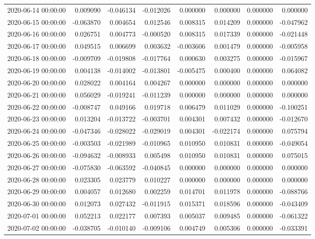 \begin{tabular}{lrrrrrrr}
2020-06-14 00:00:00 & 0.009090 & -0.046134 & -0.012026 & 0.000000 & 0.000000 & 0.000000 & 0.000000 \\
2020-06-15 00:00:00 & -0.063870 & 0.004654 & 0.012546 & 0.008315 & 0.014209 & 0.000000 & -0.047962 \\
2020-06-16 00:00:00 & 0.026751 & 0.004773 & -0.000520 & 0.008315 & 0.017339 & 0.000000 & -0.021448 \\
2020-06-17 00:00:00 & 0.049515 & 0.006699 & 0.003632 & -0.003606 & 0.001479 & 0.000000 & -0.005958 \\
2020-06-18 00:00:00 & -0.009709 & -0.019808 & -0.017764 & 0.000630 & 0.003275 & 0.000000 & -0.015967 \\
2020-06-19 00:00:00 & 0.004138 & -0.014002 & -0.013801 & -0.005475 & 0.000400 & 0.000000 & 0.064082 \\
2020-06-20 00:00:00 & 0.028022 & 0.004164 & 0.004267 & 0.000000 & 0.000000 & 0.000000 & 0.000000 \\
2020-06-21 00:00:00 & 0.056029 & -0.019241 & -0.011239 & 0.000000 & 0.000000 & 0.000000 & 0.000000 \\
2020-06-22 00:00:00 & -0.008747 & 0.049166 & 0.019718 & 0.006479 & 0.011029 & 0.000000 & -0.100251 \\
2020-06-23 00:00:00 & 0.013204 & -0.013722 & -0.003701 & 0.004301 & 0.007432 & 0.000000 & -0.012670 \\
2020-06-24 00:00:00 & -0.047346 & -0.028022 & -0.029019 & 0.004301 & -0.022174 & 0.000000 & 0.075794 \\
2020-06-25 00:00:00 & -0.003503 & -0.021989 & -0.010965 & 0.010950 & 0.010831 & 0.000000 & -0.049054 \\
2020-06-26 00:00:00 & -0.094632 & -0.008933 & 0.005498 & 0.010950 & 0.010831 & 0.000000 & 0.075015 \\
2020-06-27 00:00:00 & -0.075830 & -0.063592 & -0.040845 & 0.000000 & 0.000000 & 0.000000 & 0.000000 \\
2020-06-28 00:00:00 & 0.023305 & 0.023779 & 0.010227 & 0.000000 & 0.000000 & 0.000000 & 0.000000 \\
2020-06-29 00:00:00 & 0.004057 & 0.012680 & 0.002259 & 0.014701 & 0.011978 & 0.000000 & -0.088766 \\
2020-06-30 00:00:00 & 0.012073 & 0.027432 & -0.011915 & 0.015371 & 0.018596 & 0.000000 & -0.043409 \\
2020-07-01 00:00:00 & 0.052213 & 0.022177 & 0.007393 & 0.005037 & 0.009485 & 0.000000 & -0.061322 \\
2020-07-02 00:00:00 & -0.038705 & -0.010140 & -0.009106 & 0.004749 & 0.005306 & 0.000000 & -0.033391 \\

\end{tabular}
